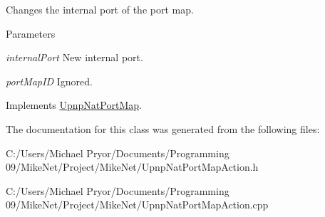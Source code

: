 Changes the internal port of the port map. 


\begin{DoxyParams}{Parameters}
\item[{\em internalPort}]New internal port. \item[{\em portMapID}]Ignored. \end{DoxyParams}


Implements \hyperlink{class_upnp_nat_port_map}{UpnpNatPortMap}.



The documentation for this class was generated from the following files:\begin{DoxyCompactItemize}
\item 
C:/Users/Michael Pryor/Documents/Programming 09/MikeNet/Project/MikeNet/UpnpNatPortMapAction.h\item 
C:/Users/Michael Pryor/Documents/Programming 09/MikeNet/Project/MikeNet/UpnpNatPortMapAction.cpp\end{DoxyCompactItemize}
